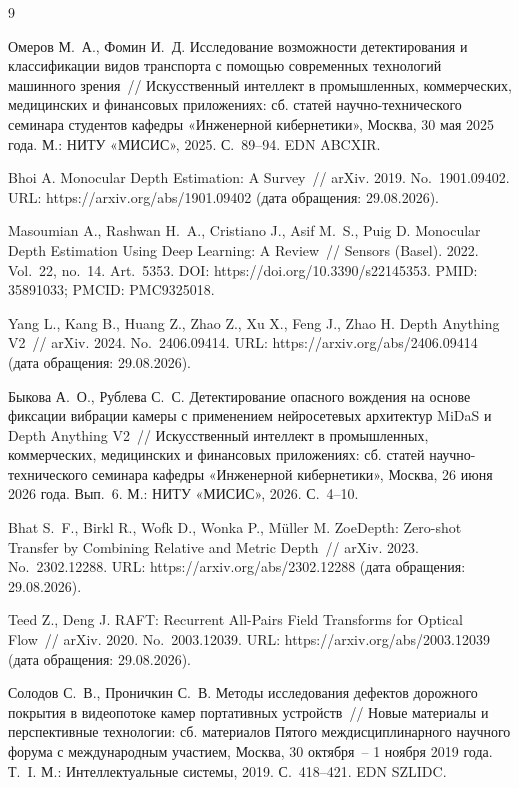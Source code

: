 \documentclass{misisarticle}
\begin{document}
\begin{thebibliography}{9}

 Омеров М.~А., Фомин И.~Д. Исследование возможности детектирования и классификации видов транспорта с помощью современных технологий машинного зрения~// Искусственный интеллект в промышленных, коммерческих, медицинских и финансовых приложениях: сб. статей научно-технического семинара студентов кафедры «Инженерной кибернетики», Москва, 30 мая 2025 года. М.: НИТУ «МИСИС», 2025. С.~89--94. EDN ABCXIR.

 Bhoi A. Monocular Depth Estimation: A Survey~// arXiv. 2019. No.~1901.09402. URL: https://arxiv.org/abs/1901.09402 (дата обращения: 29.08.2026).

 Masoumian A., Rashwan H.~A., Cristiano J., Asif M.~S., Puig D. Monocular Depth Estimation Using Deep Learning: A Review~// Sensors (Basel). 2022. Vol.~22, no.~14. Art.~5353. DOI: https://doi.org/10.3390/s22145353. PMID: 35891033; PMCID: PMC9325018.

 Yang L., Kang B., Huang Z., Zhao Z., Xu X., Feng J., Zhao H. Depth Anything V2~// arXiv. 2024. No.~2406.09414. URL: https://arxiv.org/abs/2406.09414 (дата обращения: 29.08.2026).

 Быкова А.~О., Рублева С.~С. Детектирование опасного вождения на основе фиксации вибрации камеры с применением нейросетевых архитектур MiDaS и Depth Anything V2~// Искусственный интеллект в промышленных, коммерческих, медицинских и финансовых приложениях: сб. статей научно-технического семинара кафедры «Инженерной кибернетики», Москва, 26 июня 2026 года. Вып.~6. М.: НИТУ «МИСИС», 2026. С.~4--10.

 Bhat S.~F., Birkl R., Wofk D., Wonka P., Müller M. ZoeDepth: Zero-shot Transfer by Combining Relative and Metric Depth~// arXiv. 2023. No.~2302.12288. URL: https://arxiv.org/abs/2302.12288 (дата обращения: 29.08.2026).

 Teed Z., Deng J. RAFT: Recurrent All-Pairs Field Transforms for Optical Flow~// arXiv. 2020. No.~2003.12039. URL: https://arxiv.org/abs/2003.12039 (дата обращения: 29.08.2026).

 Солодов С.~В., Проничкин С.~В. Методы исследования дефектов дорожного покрытия в видеопотоке камер портативных устройств~// Новые материалы и перспективные технологии: сб. материалов Пятого междисциплинарного научного форума с международным участием, Москва, 30 октября~-- 1 ноября 2019 года. Т.~I. М.: Интеллектуальные системы, 2019. С.~418--421. EDN SZLIDC.

\end{thebibliography}
\end{document}
